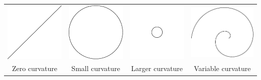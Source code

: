 \begin{center}
\begin{tabular}{c@{\qquad}c@{\qquad}c@{\qquad}c}
\includegraphics[scale=0.8]{intro-curve}&\includegraphics[scale=0.8]{intro-curve3}&\includegraphics[scale=0.8]{intro-curve2}
&\includegraphics[scale=0.8]{intro-curve4}\\[5pt]
Zero curvature&Small curvature&Larger curvature
&Variable curvature
\end{tabular}
\end{center}

